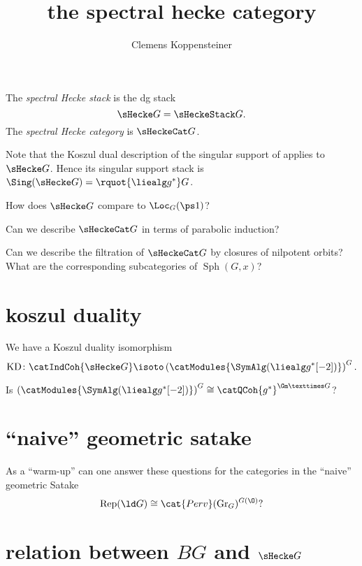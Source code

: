 \documentclass[english]{short-notes}
\title{the spectral hecke category}
\author{Clemens Koppensteiner}
\newcommand\KD{\operatorname{KD}}
\begin{document}
\maketitle

\begin{Def}
    The \emph{spectral Hecke stack} is the dg stack
    \[
        \sHecke G = \sHeckeStack G.
    \]
    The \emph{spectral Hecke category} is $\sHeckeCat G$.
\end{Def}

Note that the Koszul dual description of the singular support of applies to $\sHecke G$.
Hence its singular support stack is $\Sing(\sHecke G) = \rquot{\liealg g^*}G$.

\begin{Q}
    How does $\sHecke G$ compare to $\Loc_G(\ps 1)$?
\end{Q}

\begin{Q}
    Can we describe $\sHeckeCat G$ in terms of parabolic induction?
\end{Q}

\begin{Q}
    Can we describe the filtration of $\sHeckeCat G$ by closures of nilpotent orbits?
    What are the corresponding subcategories of $\operatorname{Sph}(G,x)$?
\end{Q}

\section*{koszul duality}

We have a Koszul duality isomorphism
\[
    \KD \colon \catIndCoh{\sHecke G} \isoto \left( \catModules{\SymAlg(\liealg g^*[-2])} \right)^G.
\]

\begin{Q}
    Is $\left( \catModules{\SymAlg(\liealg g^*[-2])} \right)^G \cong \catQCoh{g^*}^{\Gm × G}$?
\end{Q}

\section*{\enquote{naive} geometric satake}

As a \enquote{warm-up} can one answer these questions for the categories in the \enquote{naive} geometric Satake
\[
    \operatorname{Rep}(\ld G) \cong \cat{Perv}(\mathrm{Gr}_G)^{G(\O)}?
\]

\section*{relation between \texorpdfstring{$BG$ and $\sHecke G$}{BG and the spectral Hecke stack}}
\end{document}
